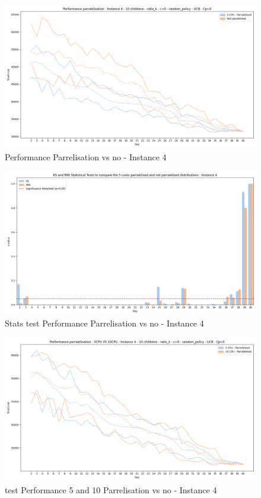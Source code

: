 \begin{figure}[!ht]
    \centering
    \includegraphics[width=\textwidth]{Figures/4 - Paralelised vs 5 CPU paralelised.png}
    \caption{Performance Parrelisation vs no - Instance 4}
    \label{fig:sim_perf_parral_4}
\end{figure}

\begin{figure}[!ht]
    \centering
    \includegraphics[width=\textwidth]{Figures/Distribution stats tests P vs NP.png}
    \caption{Stats test Performance Parrelisation vs no - Instance 4}
    \label{fig:stats test parralel}
\end{figure}

\begin{figure}[!ht]
    \centering
    \includegraphics[width=\textwidth]{Figures/4 - 5 CPU Paralelised vs 10 CPU paralelised.png}
    \caption{test Performance 5 and 10 Parrelisation vs no - Instance 4}
    \label{fig:parralel (5 vs 10)}
\end{figure}

